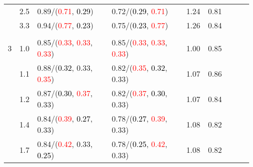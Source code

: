 \documentclass[10pt,a4paper]{report}
\begin{document}
\begin{table}[!htbp]
\begin{center}
{\begin{tabular}{ccllccccc}
				  & 2.5                               & 0.89/(\textcolor{red}{0.71}, \textcolor{black}{0.29})                                             & 0.72/(\textcolor{black}{0.29}, \textcolor{red}{0.71})                                             & 1.24             & 0.81                     \\
				  & 3.3                               & 0.94/(\textcolor{red}{0.77}, \textcolor{black}{0.23})                                             & 0.75/(\textcolor{black}{0.23}, \textcolor{red}{0.77})                                             & 1.26             & 0.84                     \\
				  &                                   &                                                                                                   &                                                                                                   &                                             \\
				3 & 1.0                               & 0.85/(\textcolor{red}{0.33}, \textcolor{red}{0.33}, \textcolor{red}{0.33})                        & 0.85/(\textcolor{red}{0.33}, \textcolor{red}{0.33}, \textcolor{red}{0.33})                        & 1.00             & 0.85                     \\
				  & 1.1                               & 0.88/(\textcolor{black}{0.32}, 0.33, \textcolor{red}{0.35})                                       & 0.82/(\textcolor{red}{0.35}, \textcolor{black}{0.32}, 0.33)                                       & 1.07             & 0.86                     \\
				  & 1.2                               & 0.87/(\textcolor{black}{0.30}, \textcolor{red}{0.37}, 0.33)                                       & 0.82/(\textcolor{red}{0.37}, \textcolor{black}{0.30}, 0.33)                                       & 1.07             & 0.84                     \\
				  & 1.4                               & 0.84/(\textcolor{red}{0.39}, \textcolor{black}{0.27}, 0.33)                                       & 0.78/(\textcolor{black}{0.27}, \textcolor{red}{0.39}, 0.33)                                       & 1.08             & 0.82                     \\
				  & 1.7                               & 0.84/(\textcolor{red}{0.42}, 0.33, \textcolor{black}{0.25})                                       & 0.78/(\textcolor{black}{0.25}, \textcolor{red}{0.42}, 0.33)                                       & 1.08             & 0.82                     \\

\end{tabular}}
\end{center}
\end{table}
\end{document}
